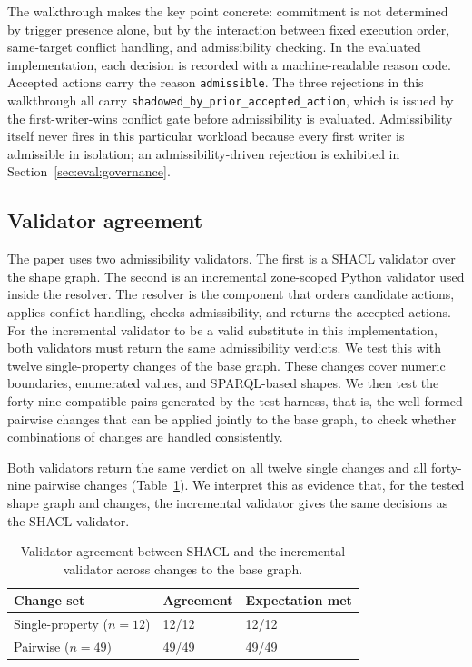 \documentclass{ieeeaccess}
\theoremstyle{definition}
\theoremstyle{plain}
\theoremstyle{remark}
\begin{document}
The walkthrough makes the key point concrete: commitment is not determined by trigger presence alone, but by the interaction between fixed execution order, same-target conflict handling, and admissibility checking. In the evaluated implementation, each decision is recorded with a machine-readable reason code. Accepted actions carry the reason \texttt{admissible}. The three rejections in this walkthrough all carry \texttt{shadowed\_by\_prior\_accepted\_action}, which is issued by the first-writer-wins conflict gate before admissibility is evaluated. Admissibility itself never fires in this particular workload because every first writer is admissible in isolation; an admissibility-driven rejection is exhibited in Section~\ref{sec:eval:governance}.

\subsection{Validator agreement}
\label{sec:eval:validator}

The paper uses two admissibility validators. The first is a SHACL validator over the shape graph. The second is an incremental zone-scoped Python validator used inside the resolver. The resolver is the component that orders candidate actions, applies conflict handling, checks admissibility, and returns the accepted actions. For the incremental validator to be a valid substitute in this implementation, both validators must return the same admissibility verdicts. We test this with twelve single-property changes of the base graph. These changes cover numeric boundaries, enumerated values, and SPARQL-based shapes. We then test the forty-nine compatible pairs generated by the test harness, that is, the well-formed pairwise changes that can be applied jointly to the base graph, to check whether combinations of changes are handled consistently.

Both validators return the same verdict on all twelve single changes and all forty-nine pairwise changes (Table~\ref{tab:validator-equivalence}). We interpret this as evidence that, for the tested shape graph and changes, the incremental validator gives the same decisions as the SHACL validator.

\begin{table}[t]
\caption{Validator agreement between SHACL and the incremental validator across changes to the base graph.}
\label{tab:validator-equivalence}
\centering
\small
\begin{tabular}{|p{3.5cm}|p{1.8cm}|p{2.3cm}|}
\hline
\textbf{Change set} & \textbf{Agreement} & \textbf{Expectation met} \\
\hline
Single-property ($n{=}12$)  & 12/12 & 12/12 \\
\hline
Pairwise ($n{=}49$)          & 49/49 & 49/49 \\
\hline
\end{tabular}
\end{table}
\end{document}
